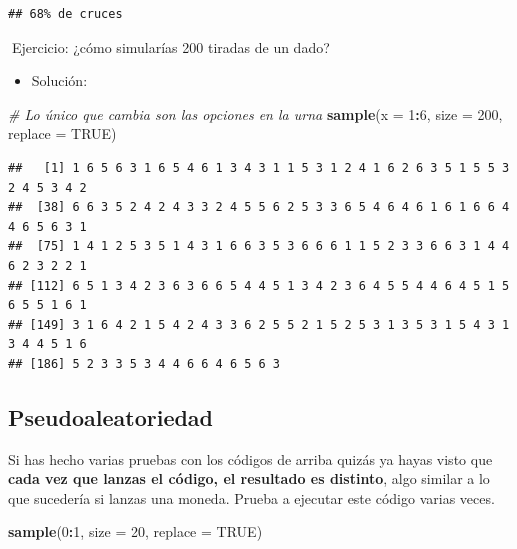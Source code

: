 \documentclass[11pt,]{book}
\newenvironment{Shaded}{\begin{snugshade}}{\end{snugshade}}
\newcommand{\CommentTok}[1]{\textcolor[rgb]{0.37,0.37,0.37}{\textit{#1}}}
\newcommand{\DataTypeTok}[1]{\textcolor[rgb]{0.27,0.27,0.27}{#1}}
\newcommand{\DecValTok}[1]{\textcolor[rgb]{0.06,0.06,0.06}{#1}}
\newcommand{\KeywordTok}[1]{\textcolor[rgb]{0.27,0.27,0.27}{\textbf{#1}}}
\newcommand{\NormalTok}[1]{#1}
\newcommand{\OperatorTok}[1]{\textcolor[rgb]{0.43,0.43,0.43}{\textbf{#1}}}
\newcommand{\OtherTok}[1]{\textcolor[rgb]{0.37,0.37,0.37}{#1}}
\providecommand{\tightlist}{%
  \setlength{\itemsep}{0pt}\setlength{\parskip}{0pt}}
\begin{document}
\begin{verbatim}
## 68% de cruces
\end{verbatim}

📝Ejercicio: ¿cómo simularías 200 tiradas de un dado?

\begin{itemize}
\tightlist
\item
  Solución:
\end{itemize}

\begin{Shaded}
\begin{Highlighting}[]
\CommentTok{# Lo único que cambia son las opciones en la urna}
\KeywordTok{sample}\NormalTok{(}\DataTypeTok{x =} \DecValTok{1}\OperatorTok{:}\DecValTok{6}\NormalTok{, }\DataTypeTok{size =} \DecValTok{200}\NormalTok{, }\DataTypeTok{replace =} \OtherTok{TRUE}\NormalTok{)}
\end{Highlighting}
\end{Shaded}

\begin{verbatim}
##   [1] 1 6 5 6 3 1 6 5 4 6 1 3 4 3 1 1 5 3 1 2 4 1 6 2 6 3 5 1 5 5 3 2 4 5 3 4 2
##  [38] 6 6 3 5 2 4 2 4 3 3 2 4 5 5 6 2 5 3 3 6 5 4 6 4 6 1 6 1 6 6 4 4 6 5 6 3 1
##  [75] 1 4 1 2 5 3 5 1 4 3 1 6 6 3 5 3 6 6 6 1 1 5 2 3 3 6 6 3 1 4 4 6 2 3 2 2 1
## [112] 6 5 1 3 4 2 3 6 3 6 6 5 4 4 5 1 3 4 2 3 6 4 5 5 4 4 6 4 5 1 5 6 5 5 1 6 1
## [149] 3 1 6 4 2 1 5 4 2 4 3 3 6 2 5 5 2 1 5 2 5 3 1 3 5 3 1 5 4 3 1 3 4 4 5 1 6
## [186] 5 2 3 3 5 3 4 4 6 6 4 6 5 6 3
\end{verbatim}

\hypertarget{pseudoaleatorio}{%
\subsection{Pseudoaleatoriedad}\label{pseudoaleatorio}}

Si has hecho varias pruebas con los códigos de arriba quizás ya hayas visto que \textbf{cada vez que lanzas el código, el resultado es distinto}, algo similar a lo que sucedería si lanzas una moneda. Prueba a ejecutar este código varias veces.

\begin{Shaded}
\begin{Highlighting}[]
\KeywordTok{sample}\NormalTok{(}\DecValTok{0}\OperatorTok{:}\DecValTok{1}\NormalTok{, }\DataTypeTok{size =} \DecValTok{20}\NormalTok{, }\DataTypeTok{replace =} \OtherTok{TRUE}\NormalTok{)}
\end{Highlighting}
\end{Shaded}
\end{document}

